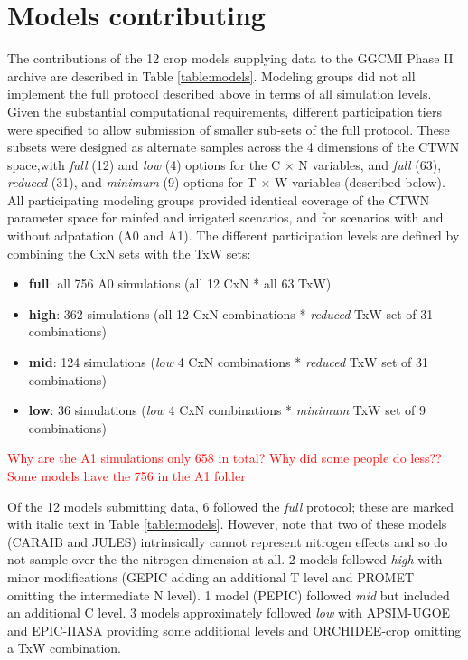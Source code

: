 \documentclass[gmd, manuscript]{copernicus} %
\begin{document}
\section{Models contributing}
\label{S:3}
The contributions of the 12 crop models supplying data to the GGCMI Phase II archive are described in Table \ref{table:models}. 
Modeling groups did not all implement the full protocol described above in terms of all simulation levels. Given the substantial computational requirements, different participation tiers were specified to allow submission of smaller sub-sets of the full protocol. 
These subsets were designed as alternate samples across the 4 dimensions of the CTWN space,with \textit{full} (12) and \textit{low} (4) options for the C $\times$ N variables, and \textit{full} (63), \textit{reduced} (31), and \textit{minimum} (9) options for T $\times$ W variables (described below). All participating modeling groups provided identical coverage of the CTWN parameter space for rainfed and irrigated scenarios, and for scenarios with and without adpatation (A0 and A1).
The different participation levels are defined by combining the CxN sets with the TxW sets:
\begin{itemize}
\item{\textbf{full}: all 756 A0 simulations (all 12 CxN * all 63 TxW)}
\item{\textbf{high}: 362 simulations (all 12 CxN combinations * \textit{reduced} TxW set of 31 combinations)}
\item{\textbf{mid}: 124 simulations (\textit{low} 4 CxN combinations * \textit{reduced} TxW set of 31 combinations)}
\item{\textbf{low}: 36 simulations (\textit{low} 4 CxN combinations * \textit{minimum} TxW set of 9 combinations)}
\end{itemize}
\textcolor{red}{Why are the A1 simulations only 658 in total? Why did some people do less?? Some models have the 756 in the A1 folder}

Of the 12 models submitting data, 6 followed the \textit{full} protocol; these are marked with italic text in Table \ref{table:models}. However, note that two of these models (CARAIB and JULES) intrinsically cannot represent nitrogen effects and so do not sample over the the nitrogen dimension at all. 2 models followed \textit{high} with minor modifications (GEPIC adding an additional T level and PROMET omitting the intermediate N level). 1 model (PEPIC) followed \textit{mid} but included an additional C level. 3 models approximately followed \textit{low} with APSIM-UGOE and EPIC-IIASA providing some additional levels and ORCHIDEE-crop omitting a TxW combination.  
\end{document}
